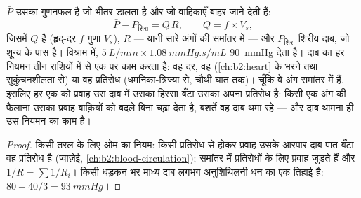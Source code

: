 \begin{theorem}\label{thm:b2:blood-pressure:equation}
 $\bar P$ उसका गुणनफल है जो 
भीतर डालता है और जो वाहिकाएँ बाहर जाने देती हैं:
\[
\bar P - P_{\text{शिरा}} = Q\,R, \qquad Q = f\times V_s,
\]
जिसमें $Q$  है (हृद्-दर $f$ गुणा 
$V_s$), $R$  --- यानी सारे
अंगों की  समांतर में --- और $P_{\text{शिरा}}$ शिरीय दाब,
जो शून्य के पास है। विश्राम में, $\qty{5}{L/min}\times\qty{1.08}{mmHg.s/mL}$
\qty{90}{mmHg} देता है। दाब का हर नियमन तीन
राशियों में से एक पर काम करता है: वह दर, वह 
(\cref{ch:b2:heart} के भरने तथा सुकुंचनशीलता से) या वह प्रतिरोध
(धमनिका-त्रिज्या से, चौथी घात तक)। चूँकि वे अंग समांतर में हैं,
इसलिए हर एक को प्रवाह उस दाब में उसका हिस्सा बँटा
उसका अपना प्रतिरोध है: किसी एक अंग की  फैलाना उसका
प्रवाह बाक़ियों को बदले बिना चढ़ा देता है, बशर्ते वह दाब थमा रहे ---
और दाब थामना ही उस नियमन का काम है।
\end{theorem}
\begin{proof}
किसी तरल के लिए ओम का नियम: किसी प्रतिरोध से होकर प्रवाह उसके आरपार
दाब-पात बँटा वह प्रतिरोध है (प्वाज़ेई,
\cref{ch:b2:blood-circulation}); समांतर में प्रतिरोधों के लिए
प्रवाह जुड़ते हैं और $1/R = \sum 1/R_i$। किसी धड़कन भर माध्य दाब
लगभग अनुशिथिलनी धन  का एक तिहाई है:
$80 + 40/3 = \qty{93}{mmHg}$।
\end{proof}

